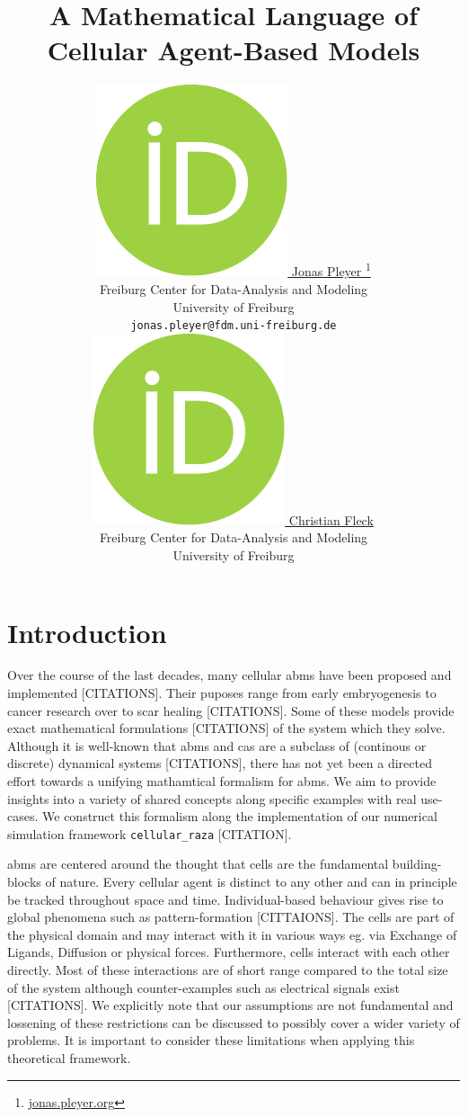 \documentclass{article}
\title{
    A Mathematical Language of\\
    Cellular Agent-Based Models
}
\author{
    \href{https://orcid.org/0009-0001-0613-7978}{
        \includegraphics[scale=0.06]{orcid.pdf}
        \hspace{1mm}Jonas Pleyer
    }
    \thanks{\href{https://jonas.pleyer.org}{jonas.pleyer.org}} \\
	    Freiburg Center for Data-Analysis and Modeling\\
	    University of Freiburg\\
	    \texttt{jonas.pleyer@fdm.uni-freiburg.de} \\
	\And
	\href{https://orcid.org/0000-0002-6371-4495}{
        \includegraphics[scale=0.06]{orcid.pdf}
        \hspace{1mm}Christian Fleck
    }\\
	Freiburg Center for Data-Analysis and Modeling\\
	University of Freiburg
}
\begin{document}
\maketitle

\begin{abstract}
\end{abstract}




\section{Introduction}
\label{sec:introduction}
Over the course of the last decades, many cellular \acp{abm} have been proposed and implemented
[CITATIONS].
Their puposes range from early embryogenesis to cancer research over to scar healing [CITATIONS].
Some of these models provide exact mathematical formulations [CITATIONS] of the system which they
solve.
Although it is well-known that \acp{abm} and \acp{ca} are a subclass of (continous or discrete)
dynamical systems [CITATIONS], there has not yet been a directed effort towards a unifying
mathamtical formalism for \acp{abm}.
We aim to provide insights into a variety of shared concepts along specific examples with real
use-cases.
We construct this formalism along the implementation of our numerical simulation framework
\lstinline{cellular_raza} [CITATION].

\acp{abm} are centered around the thought that cells are the fundamental building-blocks of nature.
Every cellular agent is distinct to any other and can in principle be tracked throughout space and
time.
Individual-based behaviour gives rise to global phenomena such as pattern-formation [CITTAIONS].
The cells are part of the physical domain and may interact with it in various ways eg. via Exchange
of Ligands, Diffusion or physical forces.
Furthermore, cells interact with each other directly.
Most of these interactions are of short range compared to the total size of the system although
counter-examples such as electrical signals exist [CITATIONS].
We explicitly note that our assumptions are not fundamental and lossening of these restrictions can
be discussed to possibly cover a wider variety of problems.
It is important to consider these limitations when applying this theoretical framework.
\end{document}
